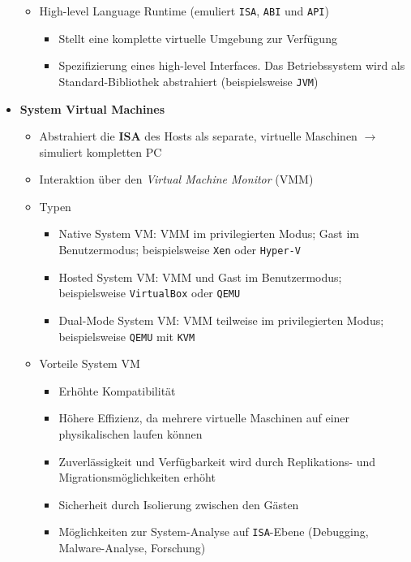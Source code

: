\begin{itemize}
\begin{itemize}
\begin{itemize}
		\end{itemize}
		\item High-level Language Runtime (emuliert \texttt{ISA}, \texttt{ABI} und \texttt{API})
		\begin{itemize}
			\item Stellt eine komplette virtuelle Umgebung zur Verfügung
			\item Spezifizierung eines high-level Interfaces. Das Betriebssystem wird als Standard-Bibliothek abstrahiert (beispielsweise \texttt{JVM})
		\end{itemize}
	\end{itemize}
	\item \textbf{System Virtual Machines}
	\begin{itemize}
		\item Abstrahiert die \textbf{ISA} des Hosts als separate, virtuelle Maschinen \(\rightarrow\) simuliert kompletten PC
		\item Interaktion über den \textit{Virtual Machine Monitor} (VMM)
		\item Typen
		\begin{itemize}
			\item Native System VM: VMM im privilegierten Modus; Gast im Benutzermodus; beispielsweise \texttt{Xen} oder \texttt{Hyper-V}
			\item Hosted System VM: VMM und Gast im Benutzermodus; beispielsweise \texttt{VirtualBox} oder \texttt{QEMU}
			\item Dual-Mode System VM: VMM teilweise im privilegierten Modus; beispielsweise \texttt{QEMU} mit \texttt{KVM}
		\end{itemize}
		\item Vorteile System VM
		\begin{itemize}
			\item Erhöhte Kompatibilität
			\item Höhere Effizienz, da mehrere virtuelle Maschinen auf einer physikalischen laufen können
			\item Zuverlässigkeit und Verfügbarkeit wird durch Replikations- und Migrationsmöglichkeiten erhöht
			\item Sicherheit durch Isolierung zwischen den Gästen
			\item Möglichkeiten zur System-Analyse auf \texttt{ISA}-Ebene (Debugging, Malware-Analyse, Forschung)
		\end{itemize}
	\end{itemize}
\end{itemize}



